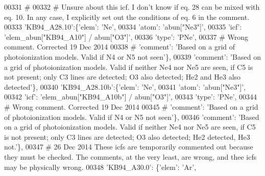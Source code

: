 \begin{DoxyCode}
00331 \textcolor{comment}{#}
00332 \textcolor{comment}{# Unsure about this icf. I don't know if eq. 28 can be mixed with eq. 10. In any case, I explicitly set out
       the conditions of eq. 6 in the comment.}
00333                          \textcolor{stringliteral}{'KB94\_A28.10'}:\{\textcolor{stringliteral}{'elem'}: \textcolor{stringliteral}{'Ne'},
00334                                      \textcolor{stringliteral}{'atom'}: \textcolor{stringliteral}{'abun["Ne3"]'},
00335                                      \textcolor{stringliteral}{'icf'}: \textcolor{stringliteral}{'elem\_abun["KB94\_A10"]  / abun["O3"]'},
00336                                       \textcolor{stringliteral}{'type'}: \textcolor{stringliteral}{'PNe'},
00337 \textcolor{comment}{# Wrong comment. Corrected 19 Dec 2014}
00338 \textcolor{comment}{#                                      'comment': 'Based on a grid of photoionization models. Valid if N4
       or N5 not seen'\},}
00339                                       \textcolor{stringliteral}{'comment'}: \textcolor{stringliteral}{'Based on a grid of photoionization models. Valid if
       neither Ne4 nor Ne5 are seen, if C5 is not present; only C3 lines are detected; O3 also detected; He2 and He3
       also detected'}\},
00340                          \textcolor{stringliteral}{'KB94\_A28.10b'}:\{\textcolor{stringliteral}{'elem'}: \textcolor{stringliteral}{'Ne'},
00341                                      \textcolor{stringliteral}{'atom'}: \textcolor{stringliteral}{'abun["Ne3"]'},
00342                                      \textcolor{stringliteral}{'icf'}: \textcolor{stringliteral}{'elem\_abun["KB94\_A10b"]  / abun["O3"]'},
00343                                       \textcolor{stringliteral}{'type'}: \textcolor{stringliteral}{'PNe'},
00344 \textcolor{comment}{# Wrong comment. Corrected 19 Dec 2014}
00345 \textcolor{comment}{#                                      'comment': 'Based on a grid of photoionization models. Valid if N4
       or N5 not seen'\},}
00346                                       \textcolor{stringliteral}{'comment'}: \textcolor{stringliteral}{'Based on a grid of photoionization models. Valid if
       neither Ne4 nor Ne5 are seen, if C5 is not present; only C3 lines are detected; O3 also detected; He2 detected,
       He3 not.'}\},
00347 \textcolor{comment}{# 26 Dec 2014 These icfs are temporarily commented out because they must be checked. The comments, at the
       very least, are wrong, and thee icfs may be physically wrong.  }
00348                          \textcolor{stringliteral}{'KB94\_A30.0'}: \{\textcolor{stringliteral}{'elem'}: \textcolor{stringliteral}{'Ar'},

\end{DoxyCode}
